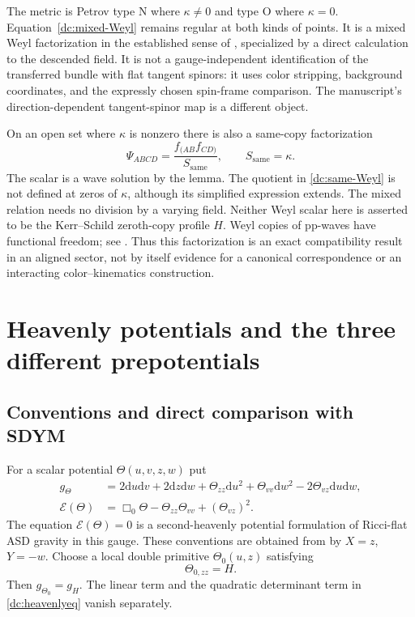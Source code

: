 \documentclass[11pt]{article}
\numberwithin{equation}{section}
\theoremstyle{remark}
\newcommand{\dd}{\mathrm d}
\begin{document}
The metric is Petrov type N where $\kappa\ne0$ and type O where
$\kappa=0$. Equation~\eqref{dc:mixed-Weyl} remains regular at both kinds
of points. It is a mixed Weyl factorization in the established sense of
\cite[Sec.~5.2, Eq.~(110)]{DC-LMNO}, specialized by a direct calculation
to the descended field. It is not a gauge-independent identification of
the transferred bundle with flat tangent spinors: it uses color
stripping, background coordinates, and the expressly chosen spin-frame
comparison. The manuscript's direction-dependent tangent-spinor map is
a different object.

On an open set where $\kappa$ is nonzero there is also a same-copy
factorization
\begin{equation}\label{dc:same-Weyl}
 \Psi_{ABCD}=\frac{f_{(AB}f_{CD)}}{S_{\mathrm{same}}},
 \qquad S_{\mathrm{same}}=\kappa.
\end{equation}
The scalar is a wave solution by the lemma. The quotient in
\eqref{dc:same-Weyl} is not defined at zeros of $\kappa$, although its
simplified expression extends. The mixed relation needs no division
by a varying field. Neither Weyl scalar here is asserted to be the
Kerr--Schild zeroth-copy profile $H$. Weyl copies of pp-waves have
functional freedom; see \cite[Sec.~IV]{DC-GGMPP}. Thus this
factorization is an exact compatibility result in an aligned sector,
not by itself evidence for a canonical correspondence or an interacting
color--kinematics construction.

\section{Heavenly potentials and the three different prepotentials}

\subsection{Conventions and direct comparison with SDYM}

For a scalar potential $\Theta(u,v,z,w)$ put
\begin{align}
 g_\Theta&=2\dd u\dd v+2\dd z\dd w
 +\Theta_{zz}\dd u^2+\Theta_{vv}\dd w^2
 -2\Theta_{vz}\dd u\dd w,
 \label{dc:heavenlymetric}\\
 \mathcal E(\Theta)&=
 \Box_0\Theta-\Theta_{zz}\Theta_{vv}+(\Theta_{vz})^2.
 \label{dc:heavenlyeq}
\end{align}
The equation $\mathcal E(\Theta)=0$ is a second-heavenly potential
formulation of Ricci-flat ASD gravity in this gauge. These conventions
are obtained from \cite[Eqs.~(2.14)--(2.20)]{DC-BGS} by $X=z$, $Y=-w$.
Choose a local double primitive $\Theta_0(u,z)$ satisfying
\begin{equation}\label{dc:primitive}
 \Theta_{0,zz}=H.
\end{equation}
Then $g_{\Theta_0}=g_H$. The linear term and the quadratic determinant
term in \eqref{dc:heavenlyeq} vanish separately.
\end{document}
